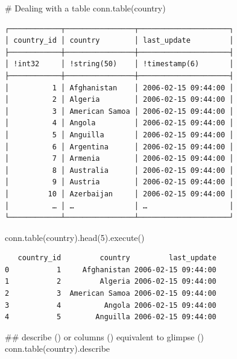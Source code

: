 \documentclass[
  letterpaper,
  DIV=11,
  numbers=noendperiod]{scrreprt}
\newenvironment{Shaded}{\begin{snugshade}}{\end{snugshade}}
\newcommand{\CommentTok}[1]{\textcolor[rgb]{0.37,0.37,0.37}{#1}}
\newcommand{\DecValTok}[1]{\textcolor[rgb]{0.68,0.00,0.00}{#1}}
\newcommand{\NormalTok}[1]{\textcolor[rgb]{0.00,0.23,0.31}{#1}}
\newcommand{\StringTok}[1]{\textcolor[rgb]{0.13,0.47,0.30}{#1}}
\begin{document}
\begin{Shaded}
\begin{Highlighting}[]
\CommentTok{\# Dealing with a table }
\NormalTok{conn.table(}\StringTok{\textquotesingle{}country\textquotesingle{}}\NormalTok{)}
\end{Highlighting}
\end{Shaded}

\begin{verbatim}
┌────────────┬────────────────┬─────────────────────┐
│ country_id │ country        │ last_update         │
├────────────┼────────────────┼─────────────────────┤
│ !int32     │ !string(50)    │ !timestamp(6)       │
├────────────┼────────────────┼─────────────────────┤
│          1 │ Afghanistan    │ 2006-02-15 09:44:00 │
│          2 │ Algeria        │ 2006-02-15 09:44:00 │
│          3 │ American Samoa │ 2006-02-15 09:44:00 │
│          4 │ Angola         │ 2006-02-15 09:44:00 │
│          5 │ Anguilla       │ 2006-02-15 09:44:00 │
│          6 │ Argentina      │ 2006-02-15 09:44:00 │
│          7 │ Armenia        │ 2006-02-15 09:44:00 │
│          8 │ Australia      │ 2006-02-15 09:44:00 │
│          9 │ Austria        │ 2006-02-15 09:44:00 │
│         10 │ Azerbaijan     │ 2006-02-15 09:44:00 │
│          … │ …              │ …                   │
└────────────┴────────────────┴─────────────────────┘
\end{verbatim}

\begin{Shaded}
\begin{Highlighting}[]
\NormalTok{conn.table(}\StringTok{\textquotesingle{}country\textquotesingle{}}\NormalTok{).head(}\DecValTok{5}\NormalTok{).execute()}
\end{Highlighting}
\end{Shaded}

\begin{verbatim}
   country_id         country         last_update
0           1     Afghanistan 2006-02-15 09:44:00
1           2         Algeria 2006-02-15 09:44:00
2           3  American Samoa 2006-02-15 09:44:00
3           4          Angola 2006-02-15 09:44:00
4           5        Anguilla 2006-02-15 09:44:00
\end{verbatim}

\begin{Shaded}
\begin{Highlighting}[]
\CommentTok{\#\# describe () or columns () equivalent to glimpse ()}
\NormalTok{conn.table(}\StringTok{\textquotesingle{}country\textquotesingle{}}\NormalTok{).describe}
\end{Highlighting}
\end{Shaded}
\end{document}
